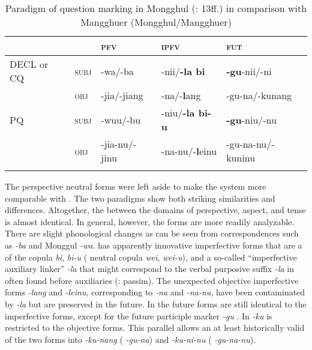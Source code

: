 \begin{table}
\caption{Paradigm of question marking in Mongghul (\citealt{Åkerman2012}: 13ff.) in comparison with Mangghuer (Mongghul/Mangghuer)}
\label{tab:mong:11}
\begin{tabularx}{\textwidth}{XXlll}
\lsptoprule
&  & \textbf{\textsc{pfv}} & \textbf{\textsc{ipfv}} & \textbf{\textsc{fut}}\\
\midrule
DECL or CQ & \textsc{subj} & -wa/-ba & -nii/\textbf{-la bi} & \textbf{-gu}-nii/-ni\\
& \textsc{obj} & -jia/-jiang & -na/-\textbf{l}ang & -gu-na/-kunang\\
PQ & \textsc{subj} & -wuu/-bu & -niu/\textbf{-}\textbf{la bi-}\textbf{u} & \textbf{-gu}-niu/-nu\\
& \textsc{obj} & -jia-nu/-jinu & -na-nu/-\textbf{l}einu & -gu-na-nu/-kuninu\\
\lspbottomrule
\end{tabularx}
\end{table}

The perspective neutral forms were left aside to make the system more comparable with . The two paradigms show both striking similarities and differences. Altogether, the  between the domains of perspective, aspect, and tense is almost identical. In general, however, the  forms are more readily analyzable. There are slight phonological changes as can be seen from correspondences such as  \textit{-ba} and Monggul \textit{-wa}.  has apparently innovative imperfective forms that are a  of the copula \textit{bi},  \textit{bi-u} ( neutral copula \textit{wei}, \textit{wei-u}), and a so-called “imperfective auxiliary linker” \textit{-la} \citep[143]{Slater2003a} that might correspond to the verbal purposive suffix \textit{-la} in  often found before auxiliaries (\citealt{Åkerman2012}: passim). The unexpected objective imperfective forms \textit{-lang} and \textit{-leinu}, corresponding to  \textit{-na} and \textit{-na-nu}, have been contaminated by \textit{-la} but are preserved in the future. In  the future forms are still identical to the imperfective forms, except for the future participle marker \textit{-gu} \citep[300]{Georg2003b}. In  \textit{-ku} is restricted to the objective forms. This parallel allows an at least historically valid  of the two  forms into \textit{-ku-nang} ( \textit{-gu-na}) and \textit{-ku-ni-nu} ( \textit{-gu-na-nu}).



